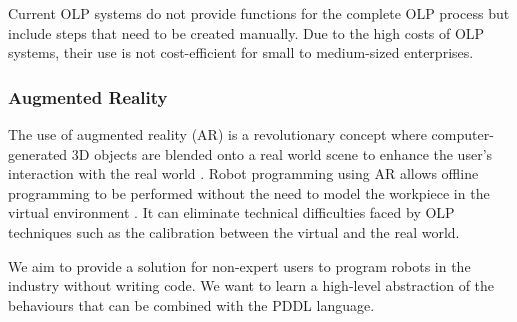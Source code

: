 Current OLP systems do not provide functions for the complete OLP process but include steps that need to be created manually. Due to the high costs of OLP systems, their use is not cost-efficient for small to medium-sized enterprises.

\subsubsection{Augmented Reality}\label{sssec:Augmented Reality}
The use of augmented reality (AR) is a revolutionary concept where computer-generated 3D objects are blended onto a real world scene to enhance the user's interaction with the real world \cite{pettersen2003augmented}. Robot programming using AR allows offline programming to be performed without the need to model the workpiece in the virtual environment \cite{pan2012recent}. It can eliminate technical difficulties faced by OLP techniques such as the calibration between the virtual and the real world.

We aim to provide a solution for non-expert users to program robots in the industry without writing code. We want to learn a high-level abstraction of the behaviours that can be combined with the PDDL language.